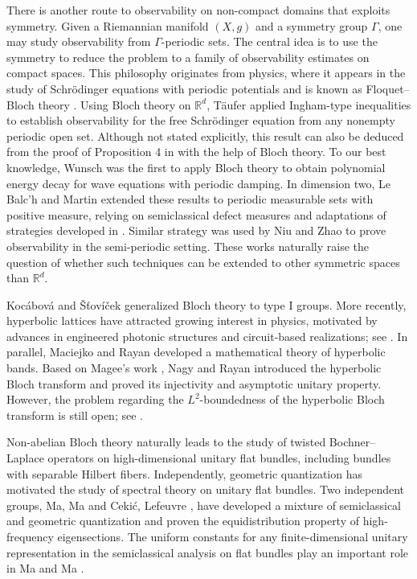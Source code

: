 \documentclass[11pt,oneside,reqno]{amsart}
\newcommand\R{\ensuremath{\mathbb{R}}}
\theoremstyle{definition}
\numberwithin{equation}{section}
\theoremstyle{plain}
\begin{document}
There is another route to observability on non-compact domains that exploits symmetry. Given a Riemannian manifold $(X,g)$ and a symmetry group $\Gamma$, one may study observability from $\Gamma$-periodic sets. The central idea is to use the symmetry to reduce the problem to a family of observability estimates on compact spaces. This philosophy originates from physics, where it appears in the study of Schrödinger equations with periodic potentials and is known as Floquet–Bloch theory \cite{floquet1883sur, bloch1929quantenmechanik}. Using Bloch theory on $\R^d$, Täufer \cite{taufer2023controllability} applied Ingham-type inequalities to establish observability for the free Schrödinger equation from any nonempty periodic open set. Although not stated explicitly, this  result can also be deduced from the proof of Proposition 4 in \cite{wunsch2017periodic} with the help of Bloch theory. To our best knowledge, Wunsch \cite{wunsch2017periodic} was the first to apply Bloch theory to obtain polynomial energy decay for wave equations with periodic damping. In dimension two, Le Balc'h and Martin \cite{balch2023obs} extended these results to periodic measurable sets with positive measure, relying on semiclassical defect measures and adaptations of strategies developed in \cite{burq2012control, bourgain2013control, burq2019roughcontrols}. Similar strategy was used by Niu and Zhao \cite{niu2025obs} to prove observability in the semi-periodic setting. These works naturally raise the question of whether such techniques can be extended to other symmetric spaces than $\R^d$.

Kocábová and Šťovíček \cite{kocabova2008generalized} generalized Bloch theory to type I groups. More recently, hyperbolic lattices have attracted growing interest in physics, motivated by advances in engineered photonic structures and circuit-based realizations; see \cite{hyperboliclattices2019, hyperboliccircuit2022}. In parallel, Maciejko and Rayan \cite{maciejko2021hyperbolic,  maciejko2022automorphic} developed a mathematical theory of hyperbolic bands. Based on Magee's work \cite{magee2022random, magee2025random}, Nagy and Rayan \cite{nagy2024hyperbolic} introduced the hyperbolic Bloch transform and proved its injectivity and asymptotic unitary property. However, the problem regarding the $L^2$-boundedness of the hyperbolic Bloch transform is still open; see \cite[Remark 3.8]{nagy2024hyperbolic}. 

Non-abelian Bloch theory naturally leads to the study of twisted Bochner–Laplace operators on high-dimensional unitary flat bundles, including bundles with separable Hilbert fibers. Independently, geometric quantization has motivated the study of spectral theory on unitary flat bundles. Two independent groups, Ma, Ma \cite{mama2024semiclassical} and Cekić, Lefeuvre \cite{cekiclefeuvre2024semiclassical}, have developed a mixture of semiclassical and geometric quantization and proven the equidistribution property of high-frequency eigensections. The uniform constants for any finite-dimensional unitary representation in the semiclassical analysis on flat bundles play an important role in Ma and Ma \cite{mama2024semiclassical}.
\end{document}
